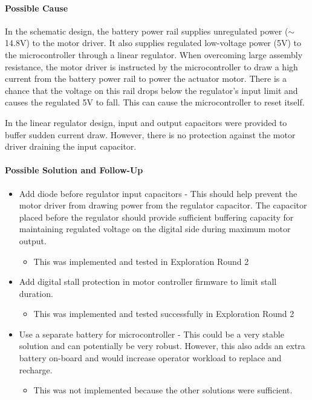 \paragraph{Possible Cause}

In the schematic design, the battery power rail supplies unregulated power ($\sim$ 14.8V) to the motor driver. It also supplies regulated low-voltage power (5V) to the microcontroller through a linear regulator. When overcoming large assembly resistance, the motor driver is instructed by the microcontroller to draw a high current from the battery power rail to power the actuator motor. There is a chance that the voltage on this rail drops below the regulator’s input limit and causes the regulated 5V to fall. This can cause the microcontroller to reset itself.

In the linear regulator design, input and output capacitors were provided to buffer sudden current draw. However, there is no protection against the motor driver draining the input capacitor.

\paragraph{Possible Solution and Follow-Up}

\begin{itemize}[nosep]
    \item Add diode before regulator input capacitors - This should help prevent the motor driver from drawing power from the regulator capacitor. The capacitor placed before the regulator should provide sufficient buffering capacity for maintaining regulated voltage on the digital side during maximum motor output.
    \begin{itemize}
        \item This was implemented and tested in Exploration Round 2 
    \end{itemize}
    \item Add digital stall protection in motor controller firmware to limit stall duration.
    \begin{itemize}
        \item This was implemented and tested successfully in Exploration Round 2 
    \end{itemize}
    \item Use a separate battery for microcontroller - This could be a very stable solution and can potentially be very robust. However, this also adds an extra battery on-board and would increase operator workload to replace and recharge.
    \begin{itemize}
        \item This was not implemented because the other solutions were sufficient.
    \end{itemize}
\end{itemize}


